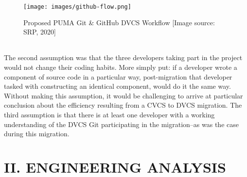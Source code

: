 \documentclass{article}
\begin{document}
{\begin{figure}[h]
\centering
\texttt{[image: images/github-flow.png]}
\caption{Proposed PUMA Git \& GitHub DVCS Workflow [Image source: SRP, 2020]}
\end{figure}
\\
\indent
The second assumption was that the three developers taking part in the project would not change their coding habits. More simply put: if a developer wrote a component of source code in a particular way, post-migration that developer tasked with constructing an identical component, would do it the same way. Without making this assumption, it would be challenging to arrive at particular conclusion about the  efficiency resulting from a CVCS to DVCS migration. The third assumption is that there is at least one developer with a working understanding of the DVCS Git participating in the migration--as was the case during this migration.
}
\newpage
\centering
\section*{II. ENGINEERING ANALYSIS}
\justify
\end{document}
